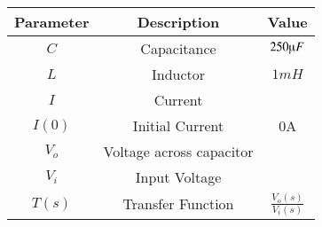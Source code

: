 \begin{tabular}{|c|c|c|}
\hline
    \textbf{Parameter} & \textbf{Description} & \textbf{Value} \\
    \hline
    $C$ & Capacitance & $250\micro F$\\
    \hline
    $L$ & Inductor & $1mH$\\
    \hline
    $I$ & Current &  \\
    \hline
    $I(0)$ & Initial Current & 0A \\
    \hline
    $V_o$ & Voltage across capacitor & \\
    \hline 
    $V_i$ & Input Voltage & \\
    \hline 
    $T(s)$ & Transfer Function & $\frac{V_o(s)}{V_i(s)}$\\
    \hline
    \end{tabular}
